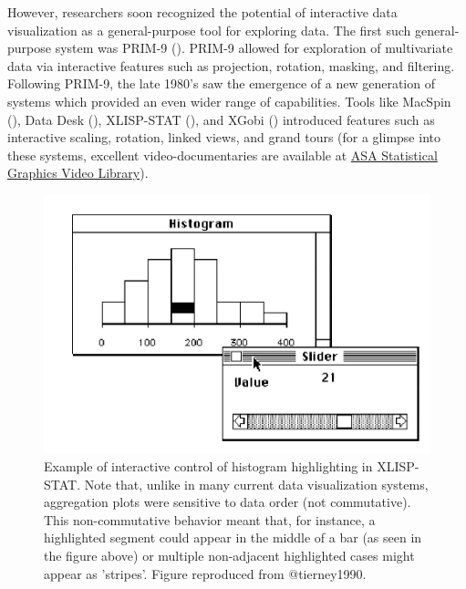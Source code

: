 \documentclass[
]{book}
\theoremstyle{definition}
\theoremstyle{definition}
\theoremstyle{definition}
\theoremstyle{definition}
\theoremstyle{remark}
\begin{document}
However, researchers soon recognized the potential of interactive data visualization as a general-purpose tool for exploring data. The first such general-purpose system was PRIM-9 (). PRIM-9 allowed for exploration of multivariate data via interactive features such as projection, rotation, masking, and filtering. Following PRIM-9, the late 1980's saw the emergence of a new generation of systems which provided an even wider range of capabilities. Tools like MacSpin (), Data Desk (), XLISP-STAT (), and XGobi () introduced features such as interactive scaling, rotation, linked views, and grand tours (for a glimpse into these systems, excellent video-documentaries are available at \href{https://community.amstat.org/jointscsg-section/media/videos}{ASA Statistical Graphics Video Library}).

\begin{figure}

{\centering \includegraphics[width=1\linewidth,height=1\textheight]{./figures/xlisp-stat} 

}

\caption{Example of interactive control of histogram highlighting in XLISP-STAT. Note that, unlike in many current data visualization systems, aggregation plots were sensitive to data order (not commutative). This non-commutative behavior meant that, for instance, a highlighted segment could appear in the middle of a bar (as seen in the figure above) or multiple non-adjacent highlighted cases might appear as 'stripes'. Figure reproduced from @tierney1990.}\label{fig:xlisp-stat}
\end{figure}
\end{document}
